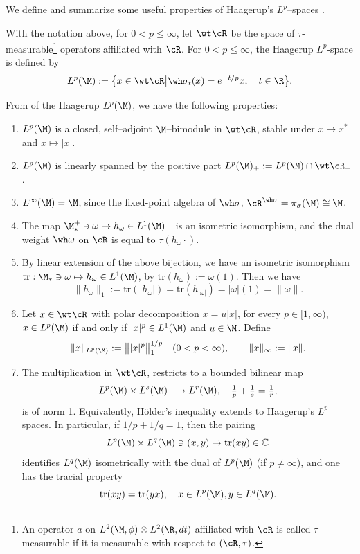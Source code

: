 \documentclass[sn-mathphys-num]{sn-jnl}
\begin{document}
We define and summarize some useful properties of Haagerup's $L^p$--spaces \cite{haagerup1979lpspaces}.
\begin{definition}\label{def:Hlp}
    With the notation above, for $0 < p \le \infty$, let $\wt\cR$ be the space of $\tau$-measurable\footnote{An operator $a$ on $L^2(\M,\phi)\otimes L^2(\R,dt)$ affiliated with $\cR$ is called $\tau$-measurable \cite{Terp1981} if it is measurable with respect to $(\cR,\tau)$.} operators affiliated with $\cR$. For $0 < p \le \infty$, the Haagerup $L^p$-space is defined by
\[
  L^p(\M)
  :=\bigl\{ x\in \wt \cR \big| \wh\sigma_t(x)=e^{-t/p} x,\quad t\in\R\bigr\}.
\]
\end{definition}
\begin{proposition} \label{prop:h-lp}
From  of the Haagerup $L^p(\M)$,
we have the following properties:
\begin{enumerate}[label=(\roman*)]
  \item $L^p(\M)$ is a closed, self--adjoint $\M$--bimodule in $\wt \cR$, stable under $x\mapsto x^*$ and $x\mapsto|x|$.
  \item
$L^p(\M)$ is linearly spanned by the positive part  $
  L^p(\M)_+
  := L^p(\M)\cap\wt\cR_+
$.

  \item $L^\infty(\M)=\M$, since the fixed-point algebra of $\wh \sigma$, $\cR^{\wh\sigma}=\pi_\sigma(\M)\cong\M$.
  \item The map $\M_*^+ \ni \omega\mapsto h_\omega\in L^1(\M)_+$ is an isometric isomorphism, and the dual weight $\wh \omega$ on $\cR$ is equal to $\tau(h_\omega \cdot).$
  \item By linear extension of the above bijection, we have an isometric isomorphism $\mathrm{tr}: \M_* \ni \omega\mapsto h_\omega\in L^1(\M)$, by $\mathrm{tr}(h_\omega):=\omega(1)$. Then we have $$\|{h_\omega}\|_{1}:=\mathrm{tr}(|h_\omega|)=\mathrm{tr}(h_{|\omega|})=|\omega|(1)=\|{\omega}\|.$$
  \item Let $x\in\wt\cR$ with polar decomposition $x=u|x|$, for every $p\in[1,\infty)$, $x\in L^p(\M)$  if and only if $|x|^p\in L^1(\M)$ and $u\in\M$. Define
\[
      \|x\|_{L^p(\M)}
  := \bigl\| |x|^p\bigr\|_1^{1/p}
  \quad(0<p<\infty),
  \qquad
  \|x\|_\infty := \|x\|.
\]

 \item The multiplication in $\wt\cR$, restricts to a bounded bilinear map
\[
  L^p(\M)\times L^{s}(\M) \longrightarrow L^r(\M),
  \quad  \tfrac1p + \tfrac1{s}=\tfrac1r,
\]
is of norm 1. Equivalently, Hölder's inequality extends to Haagerup's $L^p$ spaces.  In particular, if $1/p+1/q=1$, then the pairing
\[
  L^p(\M)\times L^{q}(\M) \ni (x,y) \mapsto \mathrm{tr}(xy)\in \mathbb{C}
\]
identifies $L^{q}(\M)$ isometrically with the dual of $L^p(\M)$ (if $p\neq\infty$), and one has the tracial property
\[
  \mathrm{tr}(xy)=\mathrm{tr}(yx),
  \quad x\in L^p(\M), y\in L^{q}(\M).
\]
\end{enumerate}
\end{proposition}
\end{document}
